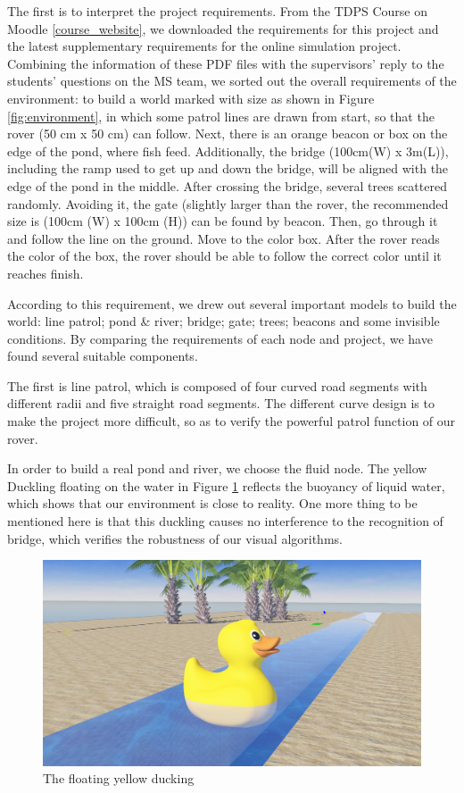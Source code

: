The first is to interpret the project requirements. From the TDPS Course on Moodle \ref{course_website}, we downloaded the requirements for this project and the latest supplementary requirements for the online simulation project. Combining the information of these PDF files with the supervisors' reply to the students' questions on the MS team, we sorted out the overall requirements of the environment: to build a world marked with size as shown in Figure \ref{fig:environment}, in which some patrol lines are drawn from start, so that the rover (50 cm x 50 cm) can follow. Next, there is an orange beacon or box on the edge of the pond, where fish feed. Additionally, the bridge (100cm(W) x 3m(L)), including the ramp used to get up and down the bridge, will be aligned with the edge of the pond in the middle. After crossing the bridge, several trees scattered randomly. Avoiding it, the gate (slightly larger than the rover, the recommended size is (100cm (W) x 100cm (H)) can be found by beacon. Then, go through it and follow the line on the ground. Move to the color box. After the rover reads the color of the box, the rover should be able to follow the correct color until it reaches finish.

According to this requirement, we drew out several important models to build the world: line patrol; pond \& river; bridge; gate; trees; beacons and some invisible conditions. By comparing the requirements of each node and project, we have found several suitable components. 

The first is line patrol, which is composed of four curved road segments with different radii and five straight road segments. The different curve design is to make the project more difficult, so as to verify the powerful patrol function of our rover. 

In order to build a real pond and river, we choose the fluid node. The yellow Duckling floating on the water in Figure \ref{fig:duck} reflects the buoyancy of liquid water, which shows that our environment is close to reality. One more thing to be mentioned here is that this duckling  causes no interference to the recognition  of bridge, which verifies the robustness of our visual algorithms.

\begin{figure}[htbp]
    \centering
    \includegraphics[width=12cm]{implementation/img_xiong/duck.png}
    \caption{The floating yellow ducking}
    \label{fig:duck}
\end{figure}

